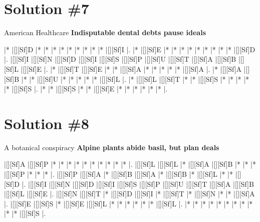 \documentclass[letterpaper]{article}
\begin{document}
\newpage
\section*{Solution \#7}
American Healthcare
\newline\textbf{Indisputable dental debts pause ideals}

\vspace*{1em}
\begin{Puzzle}{12}{7}
|*        |[][Sf]D  |*        |*        |*        |*        |*        |*        |*        |*        |*        |[][Sf]I  |.
|*        |[][Sf]E  |*        |*        |*        |*        |*        |*        |*        |*        |*        |[][Sf]D  |.  
|[][Sf]I  |[][Sf]N  |[][Sf]D  |[][Sf]I  |[][Sf]S  |[][Sf]P  |[][Sf]U  |[][Sf]T  |[][Sf]A  |[][Sf]B  |[][Sf]L  |[][Sf]E  |.
|*        |[][Sf]T  |[][Sf]E  |*        |*        |[][Sf]A  |*        |*        |*        |*        |*        |[][Sf]A  |. 
|*        |[][Sf]A  |[][Sf]B  |*        |*        |[][Sf]U  |*        |*        |*        |*        |*        |[][Sf]L  |.
|*        |[][Sf]L  |[][Sf]T  |*        |*        |[][Sf]S  |*        |*        |*        |*        |*        |[][Sf]S  |.
|*        |*        |[][Sf]S  |*        |*        |[][Sf]E  |*        |*        |*        |*        |*        |*        |.
\end{Puzzle}

\newpage
\section*{Solution \#8}
A botanical conspiracy
\newline\textbf{Alpine plants abide basil, but plan deals}

\vspace*{1em}
\begin{Puzzle}{12}{7}
|[][Sf]A  |[][Sf]P  |*        |*        |*        |*        |*        |*        |*        |*        |*        |*        |.  
|[][Sf]L  |[][Sf]L  |*        |[][Sf]A  |[][Sf]B  |*        |*        |*        |[][Sf]P  |*        |*        |*        |.
|[][Sf]P  |[][Sf]A  |*        |[][Sf]B  |[][Sf]A  |*        |[][Sf]B  |*        |[][Sf]L  |*        |*        |[][Sf]D  |.  
|[][Sf]I  |[][Sf]N  |[][Sf]D  |[][Sf]I  |[][Sf]S  |[][Sf]P  |[][Sf]U  |[][Sf]T  |[][Sf]A  |[][Sf]B  |[][Sf]L  |[][Sf]E  |.
|[][Sf]N  |[][Sf]T  |*        |[][Sf]D  |[][Sf]I  |*        |[][Sf]T  |*        |[][Sf]N  |*        |*        |[][Sf]A  |. 
|[][Sf]E  |[][Sf]S  |*        |[][Sf]E  |[][Sf]L  |*        |*        |*        |*        |*        |*        |[][Sf]L  |.
|*        |*        |*        |*        |*        |*        |*        |*        |*        |*        |*        |[][Sf]S  |.
\end{Puzzle}
\end{document}
